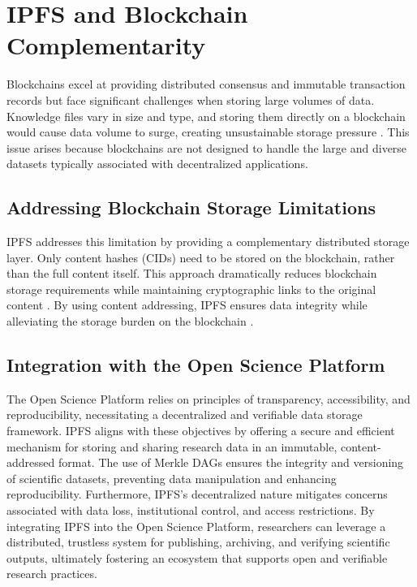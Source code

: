 \documentclass{article}
\begin{document}
\section{IPFS and Blockchain Complementarity}

Blockchains excel at providing distributed consensus and immutable transaction records but face significant challenges when storing large volumes of data. Knowledge files vary in size and type, and storing them directly on a blockchain would cause data volume to surge, creating unsustainable storage pressure \cite{miller2016scaling, xu2018survey}. This issue arises because blockchains are not designed to handle the large and diverse datasets typically associated with decentralized applications.


\subsection{Addressing Blockchain Storage Limitations}


IPFS addresses this limitation by providing a complementary distributed storage layer. Only content hashes (CIDs) need to be stored on the blockchain, rather than the full content itself. This approach dramatically reduces blockchain storage requirements while maintaining cryptographic links to the original content \cite{benet2014ipfs, wood2014ethereum}. By using content addressing, IPFS ensures data integrity while alleviating the storage burden on the blockchain \cite{zhang2020decentralized}.


\subsection{Integration with the Open Science Platform}

The Open Science Platform relies on principles of transparency, accessibility, and reproducibility, necessitating a decentralized and verifiable data storage framework. IPFS aligns with these objectives by offering a secure and efficient mechanism for storing and sharing research data in an immutable, content-addressed format. The use of Merkle DAGs ensures the integrity and versioning of scientific datasets, preventing data manipulation and enhancing reproducibility. Furthermore, IPFS's decentralized nature mitigates concerns associated with data loss, institutional control, and access restrictions. By integrating IPFS into the Open Science Platform, researchers can leverage a distributed, trustless system for publishing, archiving, and verifying scientific outputs, ultimately fostering an ecosystem that supports open and verifiable research practices.
\end{document}

